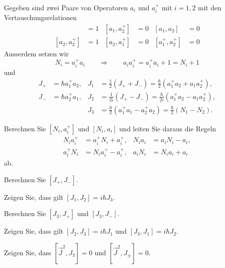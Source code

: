 Gegeben sind zwei Paare von Operatoren $a_i$ und $a_i^+$ mit $i=1,2$
mit den Vertauschungsrelationen
\begin{align*}
[a_1,a_1^+]&=1&[a_1,a_2^+]&=0&[a_1,a_2]&=0\\
[a_2,a_2^+]&=1&[a_2,a_1^+]&=0&[a_1^+,a_2^+]&=0
\end{align*}
Ausserdem setzen wir 
\[
N_i=a_i^+a_i
\qquad
\Rightarrow
\qquad
a_ia_i^+=a_i^+a_i+1=N_i+1
\]
und
\begin{align*}
J_+
&=
\hbar a_1^+a_2,
&
J_1
&=
\frac12(J_++J_-)
=
\frac{\hbar}2(a_1^+a_2+a_1a_2^+),
\\
J_-
&=
\hbar a_2^+a_1,
&
J_2
&=
\frac1{2i}(J_+-J_-)
=
\frac{\hbar}{2i}(a_1^+a_2-a_1a_2^+),
\\
&&
J_3
&=
\frac{\hbar}2(a_1^+a_1-a_2^+a_2)
=
\frac{\hbar}2(N_1-N_2).
\end{align*}
\begin{teilaufgaben}
\item Berechnen Sie $[N_i,a_i^+]$ und $[N_i,a_i]$ und leiten Sie daraus
die Regeln
\begin{align*}
N_ia_i^+&= a_i^+ N_i + a_i^+,
&
N_ia_i  &= a_i   N_i - a_i,
\\
a_i^+N_i&= N_ia_i^+ - a_i^+,
&
a_i N_i  &= N_i a_i   + a_i
\end{align*}
ab.
\item Berechnen Sie $[J_+,J_-]$.
\item Zeigen Sie, dass gilt $[J_1,J_2]=i\hbar J_3$.
\item Berechnen Sie $[J_3,J_+]$ und $[J_3,J_-]$.
\item Zeigen Sie, dass gilt $[J_2,J_3]=i\hbar J_1$ und $[J_3,J_1]=i\hbar J_2$.
\item Zeigen Sie, dass $[\vec J^2, J_3]=0$ und $[\vec J^2,J_\pm]=0$.
\end{teilaufgaben}

